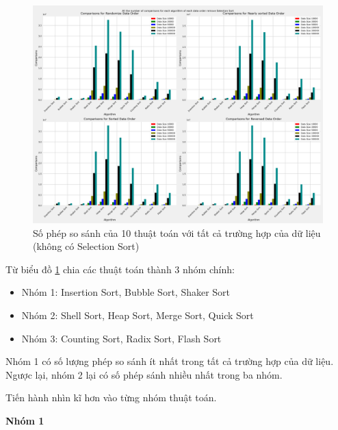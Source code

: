 \begin{figure}[H]
    \centering
    \includegraphics[width=\textwidth]{experimental_result/images/all_the_number_of_comparisons_for_each_algorithm_of_each_data_order_remove_selection_sort.png}
    \caption{Số phép so sánh của 10 thuật toán với tất cả trường hợp của dữ liệu (không có Selection Sort)}
    \label{fig:all_the_number_of_comparisons_for_each_algorithm_of_each_data_order_remove_selection_sort}
\end{figure}


Từ biểu đồ \ref{fig:all_the_number_of_comparisons_for_each_algorithm_of_each_data_order_remove_selection_sort} chia các thuật toán thành 3 nhóm chính: 
\begin{itemize}
    \item Nhóm 1: Insertion Sort, Bubble Sort, Shaker Sort 
    \item Nhóm 2: Shell Sort, Heap Sort, Merge Sort, Quick Sort
    \item Nhóm 3: Counting Sort, Radix Sort, Flash Sort
\end{itemize}

Nhóm 1 có số lượng phép so sánh ít nhất trong tất cả trường hợp của dữ liệu. Ngược lại, nhóm 2 lại có số phép sánh nhiều nhất trong ba nhóm.

Tiến hành nhìn kĩ hơn vào từng nhóm thuật toán.

\textbf{Nhóm 1}

